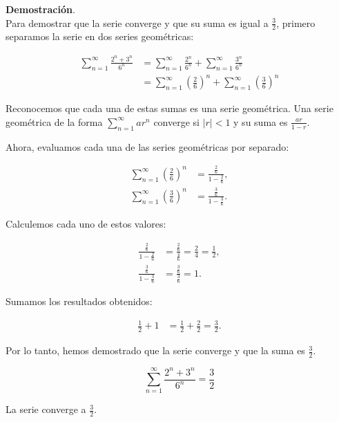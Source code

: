 \documentclass{article}
\begin{document}
    \textbf{Demostración}.\\
    Para demostrar que la serie converge y que su suma es igual a $\frac{3}{2}$, primero separamos la serie en dos series geométricas:

    \begin{align*}
    \sum_{n=1}^{\infty} \frac{2^{n}+3^{n}}{6^{n}} &=\sum_{n=1}^{\infty} \frac{2^{n}}{6^{n}} + \sum_{n=1}^{\infty} \frac{3^{n}}{6^{n}} \\
    &=\sum_{n=1}^{\infty} \left(\frac{2}{6}\right)^{n} + \sum_{n=1}^{\infty} \left(\frac{3}{6}\right)^{n}
    \end{align*}

    Reconocemos que cada una de estas sumas es una serie geométrica. Una serie geométrica de la forma $\sum_{n=1}^{\infty} ar^n$ converge si $|r| < 1$ y su suma es $\frac{ar}{1-r}$.

    Ahora, evaluamos cada una de las series geométricas por separado:

    \begin{align*}
    \sum_{n=1}^{\infty} \left(\frac{2}{6}\right)^{n} &= \frac{\frac{2}{6}}{1-\frac{2}{6}}, \\
    \sum_{n=1}^{\infty} \left(\frac{3}{6}\right)^{n} &= \frac{\frac{3}{6}}{1-\frac{3}{6}}.
    \end{align*}

    Calculemos cada uno de estos valores:

    \begin{align*}
    \frac{\frac{2}{6}}{1-\frac{2}{6}} &= \frac{\frac{2}{6}}{\frac{4}{6}} = \frac{2}{4} = \frac{1}{2},\\
    \frac{\frac{3}{6}}{1-\frac{3}{6}} &= \frac{\frac{3}{6}}{\frac{3}{6}} = 1.
    \end{align*}

    Sumamos los resultados obtenidos:

    \begin{align*}
    \frac{1}{2} + 1 &= \frac{1}{2} + \frac{2}{2} = \frac{3}{2}.
    \end{align*}

    Por lo tanto, hemos demostrado que la serie converge y que la suma es $\frac{3}{2}$.

    \begin{equation}
    \sum_{n=1}^{\infty} \frac{2^{n} + 3^{n}}{6^{n}} = \frac{3}{2}
    \end{equation}

    La serie converge a $\frac{3}{2}$.
\end{document}
